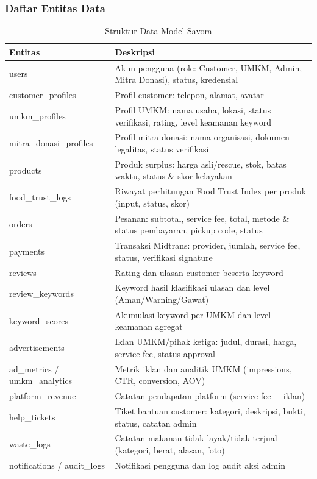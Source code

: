 \subsubsection{Daftar Entitas Data}

\begin{table}[htbp]
\centering
\caption{Struktur Data Model Savora}
\label{tab:database}
\small
\begin{tabularx}{\textwidth}{|l|X|}
\hline
\textbf{Entitas} & \textbf{Deskripsi} \\
\hline
users & Akun pengguna (role: Customer, UMKM, Admin, Mitra Donasi), status, kredensial \\
\hline
customer\_profiles & Profil customer: telepon, alamat, avatar \\
\hline
umkm\_profiles & Profil UMKM: nama usaha, lokasi, status verifikasi, rating, level keamanan keyword \\
\hline
mitra\_donasi\_profiles & Profil mitra donasi: nama organisasi, dokumen legalitas, status verifikasi \\
\hline
products & Produk surplus: harga asli/rescue, stok, batas waktu, status \& skor kelayakan \\
\hline
food\_trust\_logs & Riwayat perhitungan Food Trust Index per produk (input, status, skor) \\
\hline
orders & Pesanan: subtotal, service fee, total, metode \& status pembayaran, pickup code, status \\
\hline
payments & Transaksi Midtrans: provider, jumlah, service fee, status, verifikasi signature \\
\hline
reviews & Rating dan ulasan customer beserta keyword \\
\hline
review\_keywords & Keyword hasil klasifikasi ulasan dan level (Aman/Warning/Gawat) \\
\hline
keyword\_scores & Akumulasi keyword per UMKM dan level keamanan agregat \\
\hline
advertisements & Iklan UMKM/pihak ketiga: judul, durasi, harga, service fee, status approval \\
\hline
ad\_metrics / umkm\_analytics & Metrik iklan dan analitik UMKM (impressions, CTR, conversion, AOV) \\
\hline
platform\_revenue & Catatan pendapatan platform (service fee + iklan) \\
\hline
help\_tickets & Tiket bantuan customer: kategori, deskripsi, bukti, status, catatan admin \\
\hline
waste\_logs & Catatan makanan tidak layak/tidak terjual (kategori, berat, alasan, foto) \\
\hline
notifications / audit\_logs & Notifikasi pengguna dan log audit aksi admin \\
\hline
\end{tabularx}
\end{table}

